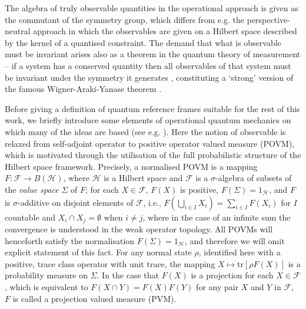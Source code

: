 \documentclass[sn-mathphys-num]{sn-jnl}%
\newcommand{\HH}{\mathcal{H}}
\numberwithin{equation}{section}
\theoremstyle{thmstyleone}%
\theoremstyle{thmstyletwo}%
\theoremstyle{thmstylethree}%
\begin{document}
 The algebra of truly observable quantities in the operational approach is given as the commutant of the symmetry group, which differs from e.g. the perspective-neutral approach \cite{Vanrietvelde:2018pgb,de2021perspective,vanrietvelde2023switching,ahmad2022quantum,Hoehn:2019owq} in which the observables are given on a Hilbert space described by the kernel of a quantised constraint. The demand that what is observable must be invariant arises also as a theorem in the quantum theory of measurement -- if a system has a conserved quantity then all observables of that system must be invariant under the symmetry it generates \cite{Loveridge2017a}, constituting a `strong' version of the famous Wigner-Araki-Yanase theorem \cite{E.Wigner1952,Busch2010,Araki1960,Loveridge2011}.

Before giving a definition of quantum reference frames suitable for the rest of this work, we briefly introduce some elements of operational quantum mechanics on which many of the ideas are based (see e.g. \cite{busch1997operational, Busch2016a}). Here the notion of observable is relaxed from self-adjoint operator to positive operator valued measure (POVM), which is motivated through the utilisation of the full probabilistic structure of the Hilbert space framework. Precisely, a normalised POVM is a mapping
 $F:\mathcal{F} \to B(\mathcal{H})$, where $\mathcal{H}$ is a Hilbert space and $\mathcal{F}$ is a $\sigma$-algebra of subsets of the \emph{value space} $\Sigma$ of $F$; for each $X \in \mathcal{F}$, $F(X)$ is positive, $F(\Sigma)=1_\HH$, and $F$ is $\sigma$-additive on disjoint elements of $\mathcal{F}$, i.e., $F(\bigcup_{i\in I}X_i) = \sum_{i\in I}F(X_i)$ for $I$ countable and $X_i\cap X_j=\emptyset$ when $i\neq j$, where in the case of an infinite sum the convergence is understood in the weak operator topology. All POVMs will henceforth satisfy the normalisation $F(\Sigma)=1_\HH$, and therefore we will omit explicit statement of this fact. For any normal state $\rho$, identified here with a positive, trace class operator with unit trace,
 the mapping $X \mapsto \mathrm{tr}[\rho F(X)]$ is a probability measure on $\Sigma$. In the case that $F(X)$ is a projection for each $X \in \mathcal{F}$, which is equivalent to $F(X \cap Y) = F(X)F(Y)$ for any pair $X$ and $Y$ in $\mathcal{F}$, $F$ is called a projection valued measure (PVM).
\end{document}

